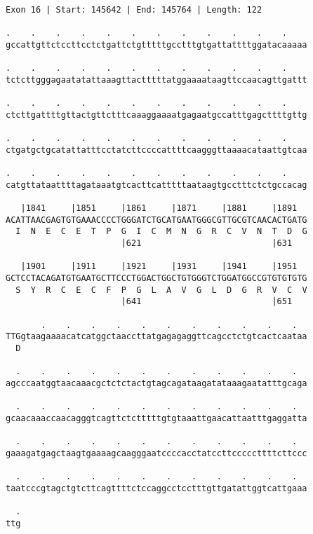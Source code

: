\documentclass{article}
\begin{document}
\begin{Verbatim}
Exon 16 | Start: 145642 | End: 145764 | Length: 122
 
.    .    .    .    .    .    .    .    .    .    .    .    
gccattgttctccttcctctgattctgtttttgcctttgtgattattttggatacaaaaa
  
.    .    .    .    .    .    .    .    .    .    .    .    
tctcttgggagaatatattaaagttactttttatggaaaataagttccaacagttgattt
  
.    .    .    .    .    .    .    .    .    .    .    .    
ctcttgattttgttactgttctttcaaaggaaaatgagaatgccatttgagcttttgttg
  
.    .    .    .    .    .    .    .    .    .    .    .    
ctgatgctgcatattatttcctatcttccccattttcaagggttaaaacataattgtcaa
  
.    .    .    .    .    .    .    .    .    .    .    .    
catgttataattttagataaatgtcacttcatttttaataagtgcctttctctgccacag
  
   |1841     |1851     |1861     |1871     |1881     |1891  
ACATTAACGAGTGTGAAACCCCTGGGATCTGCATGAATGGGCGTTGCGTCAACACTGATG
  I  N  E  C  E  T  P  G  I  C  M  N  G  R  C  V  N  T  D  G
                       |621                          |631   
  
   |1901     |1911     |1921     |1931     |1941     |1951  
GCTCCTACAGATGTGAATGCTTCCCTGGACTGGCTGTGGGTCTGGATGGCCGTGTGTGTG
  S  Y  R  C  E  C  F  P  G  L  A  V  G  L  D  G  R  V  C  V
                       |641                          |651   
  
       .    .    .    .    .    .    .    .    .    .    .  
TTGgtaagaaaacatcatggctaaccttatgagagaggttcagcctctgtcactcaataa
  D                                                         
  
  .    .    .    .    .    .    .    .    .    .    .    .  
agcccaatggtaacaaacgctctctactgtagcagataagatataaagaatatttgcaga
  
  .    .    .    .    .    .    .    .    .    .    .    .  
gcaacaaaccaacagggtcagttctctttttgtgtaaattgaacattaatttgaggatta
  
  .    .    .    .    .    .    .    .    .    .    .    .  
gaaagatgagctaagtgaaaagcaagggaatccccacctatccttcccccttttcttccc
  
  .    .    .    .    .    .    .    .    .    .    .    .  
taatcccgtagctgtcttcagttttctccaggcctcctttgttgatattggtcattgaaa
  
  .
ttg
\end{Verbatim}
\newpage
\end{document}
